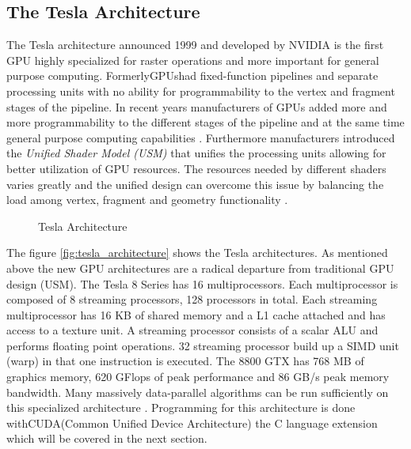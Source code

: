 \subsection*{The Tesla Architecture} %
\label{sub:the_tesla_architecture}
The Tesla architecture announced 1999 and developed by NVIDIA is the first
GPU highly specialized for raster operations and more important
for general purpose computing. Formerly\glspl{GPU}had fixed-function
pipelines and separate processing units with no ability for programmability to
the vertex and fragment stages of the pipeline. In recent years manufacturers of
GPUs added more and more programmability to the different stages
of the pipeline and at the same time general purpose computing capabilities
\citep{citeulike:3844545}. Furthermore manufacturers introduced the \emph{Unified
Shader Model (USM)} that unifies the processing units allowing for better
utilization of \gls{GPU} resources. The resources needed by different
shaders varies greatly and the unified design can overcome this issue by
balancing the load among vertex, fragment and geometry functionality
\citep{citeulike:3145468}.

\begin{figure}[ht]
\centering
\caption{Tesla Architecture}
\label{fig:tesla_architecture}
\end{figure}

The figure \autoref{fig:tesla_architecture} shows the Tesla architectures. As
mentioned above the new \gls{GPU} architectures are a radical departure
from traditional \gls{GPU} design (USM). The Tesla 8 Series has 16 multiprocessors. 
Each multiprocessor is composed of 8 streaming processors, 128 processors in 
total. Each streaming multiprocessor has 16 KB of shared memory
and a L1 cache attached and has access to a texture unit. A streaming processor
consists of a scalar ALU and performs floating point operations. 32 streaming
processor build up a SIMD unit (warp) in that one instruction is executed.
The 8800 GTX has 768 MB of graphics memory, 620 GFlops of peak performance and
86 GB/s peak memory bandwidth. Many massively data-parallel algorithms can be
run sufficiently on this specialized architecture \citep{citeulike:3145468}.
Programming for this architecture is done with\gls{CUDA}(Common Unified Device
Architecture) the C language extension which will be covered in the next
section.


